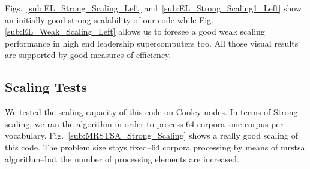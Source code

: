 \documentclass[10pt,journal,compsoc]{IEEEtran}
\begin{document}

Figs.~\ref{sub:EL_Strong_Scaling_Left} and~\ref{sub:EL_Strong_Scaling1_Left} show an initially good strong scalability of our code while Fig. \ref{sub:EL_Weak_Scaling_Left} allows us to foresee a good weak scaling performance in high end leadership supercomputers too. All those visual results are supported by good measures of efficiency.






















\subsection{ Scaling Tests}
\label{MRSTSA_Scaling_Tests}

We tested the scaling capacity of this code on Cooley nodes. In terms of Strong scaling, we ran the algorithm in order to process 64 corpora--one corpus per vocabulary. Fig.~\ref{sub:MRSTSA_Strong_Scaling} shows a really good scaling of this code. The problem size stays fixed--64 corpora processing by means of \gls{mrstsa} algorithm--but the number of processing elements are increased.
\end{document}

